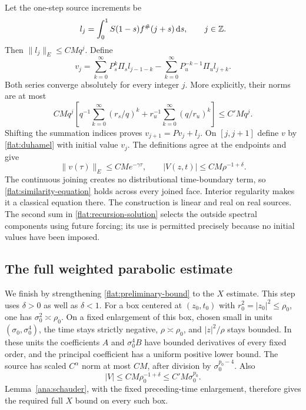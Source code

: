 Let the one-step source increments be
\[
 l_j=\int_0^1S(1-s)f^\#(j+s)\,\mathrm{d} s,\qquad j\in\mathbb{Z}.
\]
Then $\|l_j\|_E\le CMq^j$. Define
\begin{equation}\label{flat:recursion-solution}
 v_j=\sum_{k=0}^\infty P_s^k\Pi_s l_{j-1-k}
       -\sum_{k=0}^\infty P_u^{-k-1}\Pi_u l_{j+k}.
\end{equation}
Both series converge absolutely for every integer $j$. More
explicitly, their norms are at most
\[
 CMq^j\left[
   q^{-1}\sum_{k=0}^\infty(r_s/q)^k
       +r_u^{-1}\sum_{k=0}^\infty(q/r_u)^k\right]
 \le C'Mq^j.
\]
Shifting the summation indices proves
$v_{j+1}=Pv_j+l_j$. On $[j,j+1]$ define $v$ by
\eqref{flat:duhamel} with initial value $v_j$.
The definitions agree at the endpoints and give
\begin{equation}\label{flat:preliminary-bound}
 \|v(\tau)\|_E\le CM e^{-\gamma\tau},\qquad
 |V(z,t)|\le CM\rho^{-1+\delta}.
\end{equation}
The continuous joining creates no distributional time-boundary
term, so \eqref{flat:similarity-equation} holds across every joined
face. Interior regularity makes it a classical equation there.
The construction is linear and real on real sources. The second
sum in \eqref{flat:recursion-solution} selects the outside spectral
components using future forcing; its use is permitted precisely
because no initial values have been imposed.

\subsection{The full weighted parabolic estimate}

We finish by strengthening \eqref{flat:preliminary-bound} to the
$X$ estimate. This step uses $\delta>0$ as well as $\delta<1$.
For a box centered at $(z_0,t_0)$ with
$r_0^2=|z_0|^2\le\rho_0$, one has
$\sigma_0^2\asymp\rho_0$. On a fixed enlargement of this box,
chosen small in units $(\sigma_0,\sigma_0^4)$, the time stays
strictly negative, $\rho\asymp\rho_0$, and
$|z|^2/\rho$ stays bounded. In these units the coefficients
$A$ and $\sigma_0^4B$ have bounded derivatives of every fixed order,
and the principal coefficient has a uniform positive lower bound.
The source has scaled $C^\alpha$ norm at most $CM$, after division
by $\sigma_0^{p_0-4}$. Also
\[
 |V|\le CM\rho_0^{-1+\delta}
          \le C'M\sigma_0^{p_0}.
\]
Lemma~\ref{ana:schauder}, with the fixed preceding-time enlargement,
therefore gives the required full $X$ bound on every such box.

